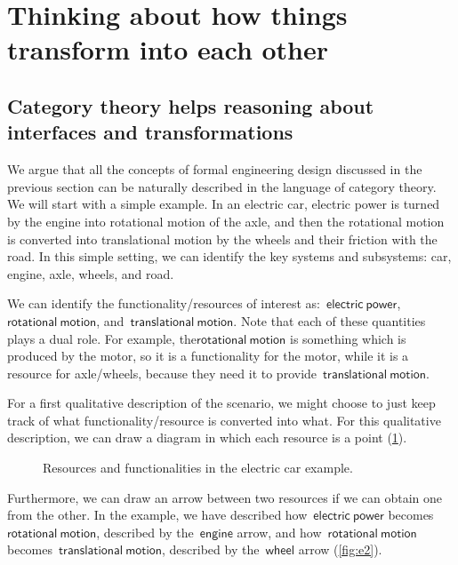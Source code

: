 \section{Thinking about how things transform into each other}

\subsection{Category theory helps reasoning about interfaces and transformations}

We argue that all the concepts of formal engineering design discussed in the
previous section can be naturally described in the language of category theory. We will start with a simple example. In an electric car, electric power is turned by the engine into rotational
motion of the axle, and then the rotational motion is converted into translational motion by the wheels and their friction with the road. In this simple setting, we can identify the key systems and subsystems: car, engine, axle, wheels, and road.

We can identify the functionality/resources of interest as:~$\mathsf{electric} \ \mathsf{power}$, $\mathsf{rotational}\ \mathsf{motion}$, and~$\mathsf{translational}\ \mathsf{motion}$. Note that each of these quantities plays a dual role. For example, the$\mathsf{rotational} \ \mathsf{motion}$ is something which is produced by the motor, so it is a functionality for the motor, while it is a resource for axle/wheels, because they need it to provide~$\mathsf{translational}\ \mathsf{motion}$.

For a first qualitative description of the scenario, we might choose to just keep track of what functionality/resource is converted into what. For this qualitative description, we can draw a diagram in which each resource is a point (\cref{fig:e1}).

\begin{figure}[h!]
    \centering
    \caption{Resources and functionalities in the electric car example. \label{fig:e1}}
\end{figure}

Furthermore, we can draw an arrow between two resources if we can obtain one from the other. In the example, we have described how~$\mathsf{electric}\ \mathsf{power}$ becomes $\mathsf{rotational}\
\mathsf{motion}$, described by the~$\mathsf{engine}$ arrow, and how~$\mathsf{rotational}\
\mathsf{motion}$ becomes~$\mathsf{translational}\ \mathsf{motion}$, described by the~$\mathsf{wheel}$ arrow (\cref{fig:e2}).


